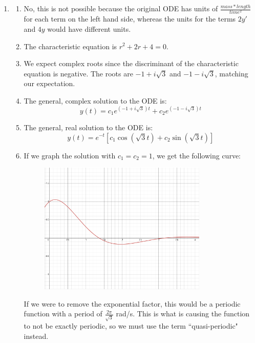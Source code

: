 

\begin{enumerate}
	\item 
    \begin{enumerate}
        \item No, this is not possible because the original ODE has units of $\frac{mass * length}{time^2}$ for each term on the left hand side, whereas the units for the terms $2y'$ and $4y$ would have different units.

        \item The characteristic equation is $r^2+2r+4 = 0$.

        \item We expect complex roots since the discriminant of the characteristic equation is negative. The roots are $-1+i\sqrt{3}$ and $-1-i\sqrt{3}$, matching our expectation.

        \item The general, complex solution to the ODE is:
        \[
        y(t) = c_1e^{(-1+i\sqrt{3})t} + c_2e^{(-1-i\sqrt{3})t}
        \]

        \item The general, real solution to the ODE is:
        \[
        y(t) = e^{-t}[c_1\cos(\sqrt{3}t)+c_2\sin{(\sqrt{3}t)}]
        \]

        \item If we graph the solution with $c_1=c_2=1$, we get the following curve:

        \begin{figure}[h]
        \includegraphics[width=8cm]{tutorials/Tut9_Q1.png}
        \centering
        \end{figure}

        If we were to remove the exponential factor, this would be a periodic function with a period of $\frac{2\pi}{\sqrt{3}}$ rad/s. This is what is causing the function to not be exactly periodic, so we must use the term ``quasi-periodic" instead.
    \end{enumerate}


\end{enumerate}
